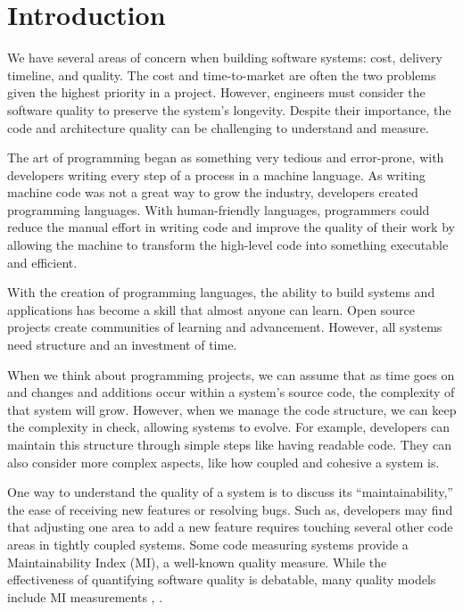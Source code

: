 \chapter{Introduction} \label{sectionIntroduction}

We have several areas of concern when building software systems: cost, delivery timeline, and quality. The cost and time-to-market are often the two problems given the highest priority in a project. However, engineers must consider the software quality to preserve the system's longevity. Despite their importance, the code and architecture quality can be challenging to understand and measure.

The art of programming began as something very tedious and error-prone, with developers writing every step of a process in a machine language. As writing machine code was not a great way to grow the industry, developers created programming languages. With human-friendly languages, programmers could reduce the manual effort in writing code and improve the quality of their work by allowing the machine to transform the high-level code into something executable and efficient. \cite{lehman:1980}

With the creation of programming languages, the ability to build systems and applications has become a skill that almost anyone can learn. Open source projects create communities of learning and advancement. However, all systems need structure and an investment of time.

When we think about programming projects, we can assume that as time goes on and changes and additions occur within a system's source code, the complexity of that system will grow. However, when we manage the code structure, we can keep the complexity in check, allowing systems to evolve. For example, developers can maintain this structure through simple steps like having readable code. They can also consider more complex aspects, like how coupled and cohesive a system is.

One way to understand the quality of a system is to discuss its ``maintainability,'' the ease of receiving new features or resolving bugs. Such as, developers may find that adjusting one area to add a new feature requires touching several other code areas in tightly coupled systems. Some code measuring systems provide a Maintainability Index (MI), a well-known quality measure. While the effectiveness of quantifying software quality is debatable, many quality models include MI measurements \cite{vandeursen:2014}, \cite{adewumi:2016}. 


